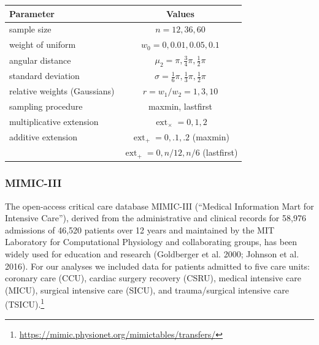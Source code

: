 \documentclass{article}
\begin{document}
\begin{table}\label{tab:bumpy-grid}
\centering
\begin{tabular}{|l|c|} \hline
Parameter & Values \\ \hline
sample size & $n = 12, 36, 60$ \\
weight of uniform & $w_0 = 0, 0.01, 0.05, 0.1$ \\
angular distance & $\mu_2 = \pi, \frac{3}{4}\pi, \frac{1}{2}\pi$ \\
standard deviation & $\sigma = \frac{1}{6}\pi, \frac{1}{3}\pi, \frac{1}{2}\pi$ \\
relative weights (Gaussians) & $r = w_1 / w_2 = 1, 3, 10$ \\
sampling procedure & maxmin, lastfirst \\
multiplicative extension & $\operatorname{ext}_\times = 0, 1, 2$ \\
additive extension & $\operatorname{ext}_+ = 0, .1, .2$ (maxmin) \\
 & $\operatorname{ext}_+ = 0, n / 12, n / 6$ (lastfirst) \\ \hline
\end{tabular}
\end{table}

\hypertarget{mimic-iii}{%
\subsubsection{MIMIC-III}\label{mimic-iii}}

\label{sec:mimic}

The open-access critical care database MIMIC-III (``Medical Information
Mart for Intensive Care''), derived from the administrative and clinical
records for 58,976 admissions of 46,520 patients over 12 years and
maintained by the MIT Laboratory for Computational Physiology and
collaborating groups, has been widely used for education and research
(Goldberger et al. 2000; Johnson et al. 2016). For our analyses we
included data for patients admitted to five care units: coronary care
(CCU), cardiac surgery recovery (CSRU), medical intensive care (MICU),
surgical intensive care (SICU), and trauma/surgical intensive care
(TSICU).\footnote{\url{https://mimic.physionet.org/mimictables/transfers/}}
\end{document}

